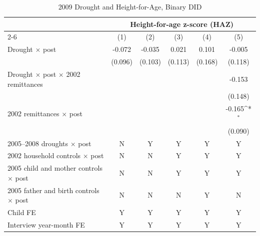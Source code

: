 \documentclass[12pt]{article}
\def\sym#1{\ifmmode^{#1}\else\(^{#1}\)\fi}
\begin{document}
\begin{longtable}{l*{5}{c}}
\caption{2009 Drought and Height-for-Age, Binary DID}\\
\toprule
 & \multicolumn{5}{c}{Height-for-age z-score (HAZ)}\\
\cmidrule(lr){2-6}
            &\multicolumn{1}{c}{(1)}         &\multicolumn{1}{c}{(2)}         &\multicolumn{1}{c}{(3)}         &\multicolumn{1}{c}{(4)}         &\multicolumn{1}{c}{(5)}         \\
\midrule
Drought \ensuremath{\times} post&      -0.072         &      -0.035         &       0.021         &       0.101         &      -0.005         \\
            &     (0.096)         &     (0.103)         &     (0.113)         &     (0.168)         &     (0.118)         \\
Drought \ensuremath{\times} post \ensuremath{\times} 2002 remittances&                     &                     &                     &                     &      -0.153         \\
            &                     &                     &                     &                     &     (0.148)         \\
2002 remittances \ensuremath{\times} post&                     &                     &                     &                     &      -0.165\sym{*}  \\
            &                     &                     &                     &                     &     (0.090)         \\
\midrule
2005--2008 droughts \ensuremath{\times} post&           N         &           Y         &           Y         &           Y         &           Y         \\
2002 household controls \ensuremath{\times} post&           N         &           N         &           Y         &           Y         &           Y         \\
2005 child and mother controls \ensuremath{\times} post&           N         &           N         &           Y         &           Y         &           Y         \\
2005 father and birth controls \ensuremath{\times} post&           N         &           N         &           N         &           Y         &           N         \\
Child FE    &           Y         &           Y         &           Y         &           Y         &           Y         \\
Interview year-month FE&           Y         &           Y         &           Y         &           Y         &           Y         \\

\end{longtable}
\end{document}

